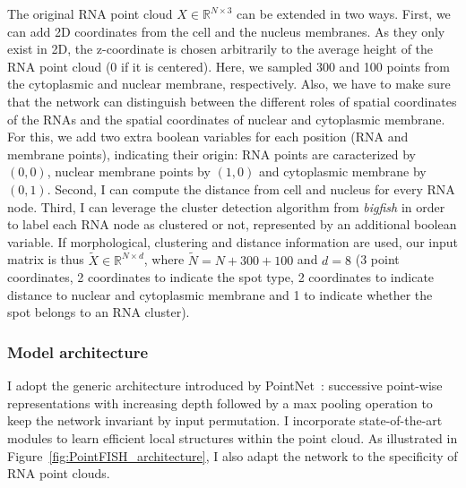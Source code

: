The original \ac{RNA} point cloud $X \in \mathbb{R}^{N \times 3}$ can be extended in two ways. First, we can add 2D coordinates from the cell and the nucleus membranes. As they only exist in 2D, the z-coordinate is chosen arbitrarily to the average height of the \ac{RNA} point cloud (0 if it is centered). Here, we sampled 300 and 100 points from the cytoplasmic and nuclear membrane, respectively. Also, we have to make sure that the network can distinguish between the different roles of spatial coordinates of the \ac{RNA}s and the spatial coordinates of nuclear and cytoplasmic membrane. For this, we add two extra boolean variables for each position (\ac{RNA} and membrane points), indicating their origin: \ac{RNA} points are caracterized by $(0,0)$, nuclear membrane points by $(1,0)$ and cytoplasmic membrane by $(0,1)$. 
Second, I can compute the distance from cell and nucleus for every \ac{RNA} node. 
Third, I can leverage the cluster detection algorithm from \emph{bigfish} in order to label each \ac{RNA} node as clustered or not, represented by an additional boolean variable. 
If morphological, clustering and distance information are used, our input matrix is thus $\tilde{X} \in \mathbb{R}^{N \times d}$, where $\tilde{N} = N + 300 + 100$ and $d=8$ (3 point coordinates, 2 coordinates to indicate the spot type, 2 coordinates to indicate distance to nuclear and cytoplasmic membrane and 1 to indicate whether the spot belongs to an \ac{RNA} cluster). 


\subsubsection{Model architecture}

I adopt the generic architecture introduced by PointNet~\cite{Qi_2017_CVPR}: successive point-wise representations with increasing depth followed by a max pooling operation to keep the network invariant by input permutation.
I incorporate state-of-the-art modules to learn efficient local structures within the point cloud.
As illustrated in Figure~\ref{fig:PointFISH_architecture}, I also adapt the network to the specificity of RNA point clouds.

